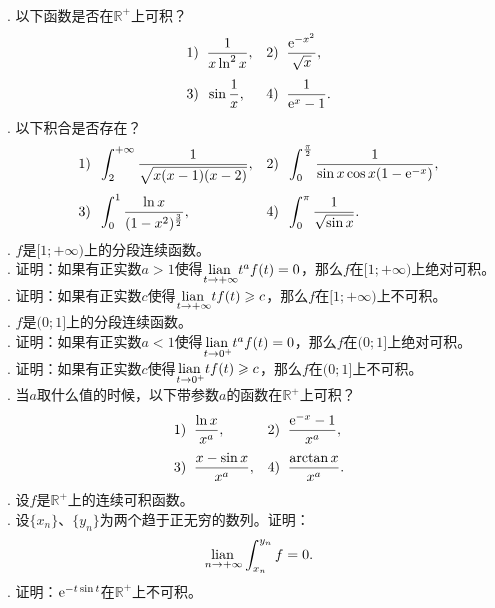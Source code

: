 \documentclass[12pt,UTF8]{ctexbook}
\begin{document}
\begin{xt}
    \mbox{} \\
    . 以下函数是否在$\mathbb{R}^+$上可积？\\    
    \begin{align*}
        1)\;\;& \frac{1}{x\ln^2{x}} ,  &2)\;\;& \frac{\mathrm{e}^{-x^2}}{\sqrt{x}}, \\[3pt]
        3)\;\;& \sin{\frac{1}{x}},  & 4)\;\;& \frac{1}{\mathrm{e}^x  - 1}.
    \end{align*}
    . 以下积合是否存在？\\    
    \begin{align*}
        1)\;\;& \int_2^{+\infty} \frac{1}{\sqrt{x(x - 1)(x - 2)}},  &2)\;\;& \int_0^{\frac{\pi}{2}} \frac{1}{\sin{x}\cos{x}(1 - \mathrm{e}^{-x})}, \\[3pt]
        3)\;\;& \int_0^{1} \frac{\ln{x}}{(1 - x^2)^{\frac{3}{2}}} , & 4)\;\;& \int_0^{\pi} \frac{1}{\sqrt{\sin{x}}}.
    \end{align*}
    . $f$是$[1;+\infty)$上的分段连续函数。\\
    . 证明：如果有正实数$a>1$使得$\underset{t\to+\infty}{\operatorname{lian}\,} t^a f(t) = 0$，那么$f$在$[1;+\infty)$上绝对可积。\\
    . 证明：如果有正实数$c$使得$\underset{t\to+\infty}{\operatorname{lian}\,} t f(t) \geqslant c$，那么$f$在$[1;+\infty)$上不可积。\\
    . $f$是$(0;1]$上的分段连续函数。\\
    . 证明：如果有正实数$a<1$使得$\underset{t\to 0^+}{\operatorname{lian}\,} t^a f(t) = 0$，那么$f$在$(0;1]$上绝对可积。\\
    . 证明：如果有正实数$c$使得$\underset{t\to 0^+}{\operatorname{lian}\,} t f(t) \geqslant c$，那么$f$在$(0;1]$上不可积。\\
    . 当$a$取什么值的时候，以下带参数$a$的函数在$\mathbb{R}^+$上可积？\\
    \begin{align*}
        1)\;\;& \frac{\ln{x}}{x^a} ,  &2)\;\;& \frac{\mathrm{e}^{-x} - 1}{x^a}, \\[3pt]
        3)\;\;& \frac{x - \sin{x}}{x^a},  & 4)\;\;& \frac{\arctan{x}}{x^a}. 
    \end{align*}
    . 设$f$是$\mathbb{R}^+$上的连续可积函数。\\
    . 设$\{x_n\}$、$\{y_n\}$为两个趋于正无穷的数列。证明：
    $$ \underset{n\to+\infty}{\operatorname{lian}\,}\int_{x_n}^{y_n} f = 0. $$
    . 证明：$\mathrm{e}^{-t\sin{t}}$在$\mathbb{R}^+$上不可积。

\end{xt}
\end{document}
